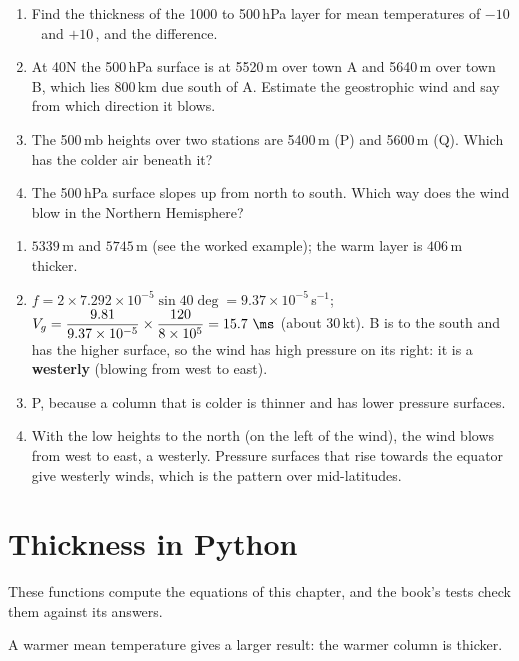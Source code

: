 \begin{tryit}
\begin{enumerate}[label=\textbf{\thechapter.\arabic*},leftmargin=*,itemsep=3pt]
\item Find the thickness of the 1000 to 500\,hPa layer for mean temperatures of $-10$\,\degC\ and $+10$\,\degC, and the difference.
\item At 40\deg N the 500\,hPa surface is at 5520\,m over town A and 5640\,m over town B, which lies 800\,km due south of A. Estimate the geostrophic wind and say from which direction it blows.
\item The 500\,mb heights over two stations are 5400\,m (P) and 5600\,m (Q). Which has the colder air beneath it?
\item The 500\,hPa surface slopes up from north to south. Which way does the wind blow in the Northern Hemisphere?
\end{enumerate}
\end{tryit}

\begin{answerbox}
\begin{enumerate}[label=\textbf{\thechapter.\arabic*},leftmargin=*,itemsep=3pt]
\item $5339$\,m and $5745$\,m (see the worked example); the warm layer is $406$\,m thicker.
\item $f=2\times7.292\times10^{-5}\sin40\deg=9.37\times10^{-5}$\,s$^{-1}$; $V_g=\dfrac{9.81}{9.37\times10^{-5}}\times\dfrac{120}{8\times10^{5}}=15.7\ \ms$ (about 30\,kt). B is to the south and has the higher surface, so the wind has high pressure on its right: it is a \textbf{westerly} (blowing from west to east).
\item P, because a column that is colder is thinner and has lower pressure surfaces.
\item With the low heights to the north (on the left of the wind), the wind blows from west to east, a westerly. Pressure surfaces that rise towards the equator give westerly winds, which is the pattern over mid-latitudes.
\end{enumerate}
\end{answerbox}

\section{Thickness in Python}

These functions compute the equations of this chapter, and the book's tests check them against its answers.



A warmer mean temperature gives a larger result: the warmer column is thicker.
